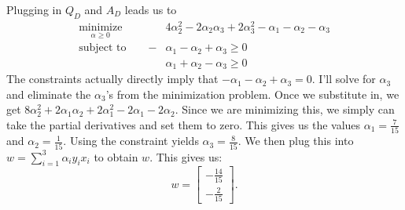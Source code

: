 \documentclass[12pt]{article}
\begin{document}
	Plugging in $Q_D$ and $A_D$ leads us to
		\begin{align*}
		\underset{\alpha \ge 0}{\text{minimize}} \qquad 
		&4\alpha_2^2 - 2\alpha_2\alpha_3 + 2\alpha_3^2-\alpha_1-\alpha_2-\alpha_3\\
		\text{subject to} \qquad -&\alpha_1-\alpha_2+\alpha_3 \ge 0\\
		\qquad &\alpha_1+\alpha_2-\alpha_3 \ge 0 
		\end{align*}
	The constraints actually directly imply that $-\alpha_1-\alpha_2+\alpha_3 = 0$. I'll solve for $\alpha_3$ and eliminate the $\alpha_3$'s from the minimization problem. Once we substitute in, we get $8\alpha_2^2 +2\alpha_1\alpha_2+2\alpha_1^2-2\alpha_1-2\alpha_2$. Since we are minimizing this, we simply can take the partial derivatives and set them to zero. This gives us the values $\alpha_1 = \frac{7}{15}$ and $\alpha_2 = \frac{1}{15}$. Using the constraint yields $\alpha_3 = \frac{8}{15}$. We then plug this into $w = \sum_{i=1}^{3} \alpha_i y_i x_i$ to obtain $w$. This gives us: 
	\begin{equation*}
		w = \left[ 
		\begin{array}{c}
		-\frac{14}{15}\\
		-\frac{2}{15}
		\end{array} \right].
	\end{equation*}
	
\end{document}
